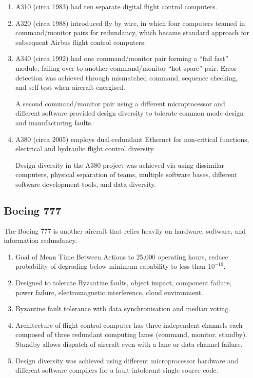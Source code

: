 \documentclass[11pt]{article}
\begin{document}
\begin{enumerate}

 \item A310 (circa 1983) had ten separate digital flight control computers.

 \item A320 (circa 1988) introduced fly by wire, in which four computers teamed in command/monitor pairs for redundancy, which became standard approach for subsequent Airbus flight control computers.

 \item A340 (circa 1992) had one command/monitor pair forming a ``fail fast'' module, failing over to another command/monitor ``hot spare'' pair.  Error detection was achieved through mismatched command, sequence checking, and self-test when aircraft energised.

 A second command/monitor pair using a different microprocessor and different software provided design diversity to tolerate common mode design and manufacturing faults.

 \item A380 (circa 2005) employs dual-redundant Ethernet for non-critical functions, electrical and hydraulic flight control diversity.

 Design diversity in the A380 project was achieved via using dissimilar computers, physical separation of teams, multiple software bases, different software development tools, and data diversity.

\end{enumerate}


\subsection*{Boeing 777}

The Boeing 777 is another aircraft that relies heavily on hardware, software, and information redundancy.

\begin{enumerate}

 \item Goal of Mean Time Between Actions to 25,000 operating hours,
reduce probability of degrading below minimum capability to less
than \(10^{-10}\).

 \item Designed to tolerate Byzantine faults, object impact, component
failure, power failure, electromagnetic interference, cloud
environment.

 \item Byzantine fault tolerance with data synchronisation and median
voting.
 
 \item Architecture of flight control computer has three independent channels each composed of three redundant computing lanes (command, monitor, standby).  Standby allows dispatch of aircraft even with a lane or data channel failure.

 \item Design diversity was achieved using different microprocessor hardware and different software compilers for a fault-intolerant single source code.

\end{enumerate}
\end{document}
